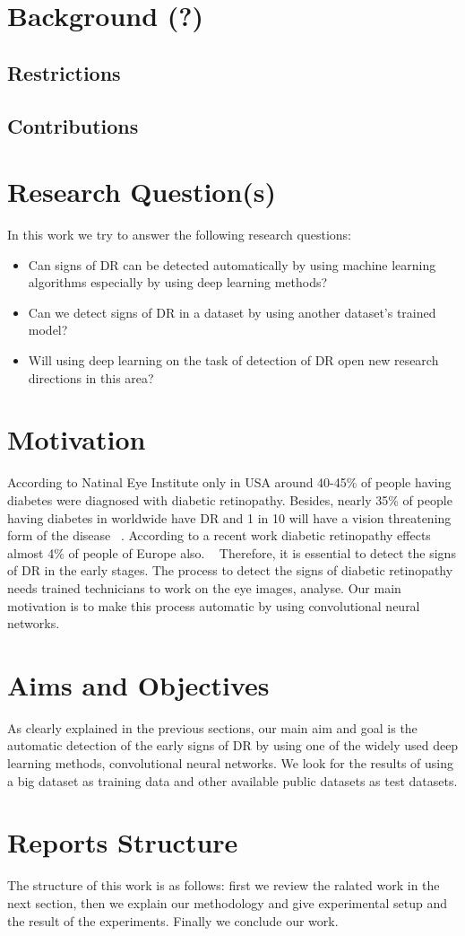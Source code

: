 \section{Background (?)} 

\subsection{Restrictions}
\subsection{Contributions}



\section{Research Question(s)}
In this work we try to answer the following research questions:

\begin{itemize}
    \item Can signs of DR can be detected automatically by using machine learning algorithms especially by using deep learning methods?
    \item Can we detect signs of DR in a dataset by using another dataset's trained model?
    \item Will using deep learning on the task of detection of DR open new research directions in this area? 
\end{itemize}
\section{Motivation}
According to Natinal Eye Institute only in USA around 40-45\% of people having diabetes were diagnosed with diabetic retinopathy. Besides, nearly 35\% of people having diabetes in worldwide have DR and 1 in 10 will have a vision threatening form of the disease ~\cite{yau2012global}. According to a recent work diabetic retinopathy effects almost 4\% of people of Europe also. ~\cite{nentwich2015diabetic} Therefore, it is essential to detect the signs of DR in the early stages. The process to detect the signs of diabetic retinopathy needs trained technicians to work on the eye images, analyse. Our main motivation is to make this process automatic by using convolutional neural networks.
\section{Aims and Objectives}
As clearly explained in the previous sections, our main aim and goal is the automatic detection of the early signs of DR by using one of the widely used deep learning methods, convolutional neural networks. We look for the results of using a big dataset as training data and other available public datasets as test datasets. 
\section{Reports Structure}
The structure of this work is as follows: first we review the ralated work in the next section, then we explain our methodology and give experimental setup and the result of the experiments. Finally we conclude our work. 
